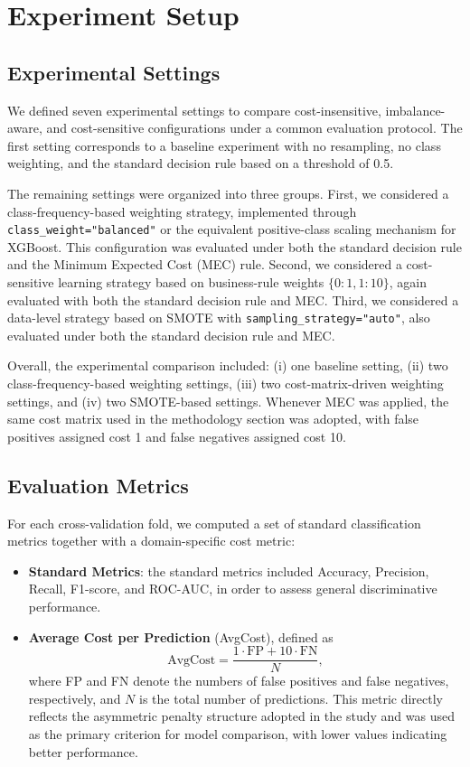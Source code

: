 \documentclass[conference]{IEEEtran}
\begin{document}
\section{Experiment Setup} \label{sec:experiment-setup}
\subsection{Experimental Settings}

We defined seven experimental settings to compare cost-insensitive, imbalance-aware, and cost-sensitive configurations under a common evaluation protocol. The first setting corresponds to a baseline experiment with no resampling, no class weighting, and the standard decision rule based on a threshold of 0.5.

The remaining settings were organized into three groups. First, we considered a class-frequency-based weighting strategy, implemented through \texttt{class\_weight="balanced"} or the equivalent positive-class scaling mechanism for XGBoost. This configuration was evaluated under both the standard decision rule and the Minimum Expected Cost (MEC) rule. Second, we considered a cost-sensitive learning strategy based on business-rule weights \(\{0:1, 1:10\}\), again evaluated with both the standard decision rule and MEC. Third, we considered a data-level strategy based on SMOTE with \texttt{sampling\_strategy="auto"}, also evaluated under both the standard decision rule and MEC.

Overall, the experimental comparison included: (i) one baseline setting, (ii) two class-frequency-based weighting settings, (iii) two cost-matrix-driven weighting settings, and (iv) two SMOTE-based settings. Whenever MEC was applied, the same cost matrix used in the methodology section was adopted, with false positives assigned cost 1 and false negatives assigned cost 10.

\subsection{Evaluation Metrics}
For each cross-validation fold, we computed a set of standard classification metrics together with a domain-specific cost metric:

\begin{itemize}
\item \textbf{Standard Metrics}: the standard metrics included Accuracy, Precision, Recall, F1-score, and ROC-AUC, in order to assess general discriminative performance. 

\item \textbf{Average Cost per Prediction} (AvgCost), defined as
\[
\text{AvgCost} = \frac{1 \cdot \text{FP} + 10 \cdot \text{FN}}{N},
\]
where FP and FN denote the numbers of false positives and false negatives, respectively, and \(N\) is the total number of predictions. This metric directly reflects the asymmetric penalty structure adopted in the study and was used as the primary criterion for model comparison, with lower values indicating better performance.
\end{itemize}
\end{document}
